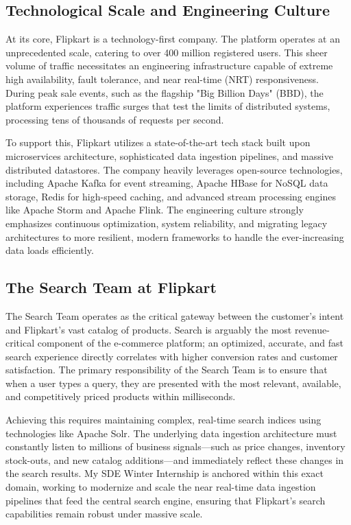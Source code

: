 \subsection{Technological Scale and Engineering Culture}
\begin{justify}
    At its core, Flipkart is a technology-first company. The platform operates at an unprecedented scale, catering to over 400 million registered users. This sheer volume of traffic necessitates an engineering infrastructure capable of extreme high availability, fault tolerance, and near real-time (NRT) responsiveness. During peak sale events, such as the flagship "Big Billion Days" (BBD), the platform experiences traffic surges that test the limits of distributed systems, processing tens of thousands of requests per second.

    To support this, Flipkart utilizes a state-of-the-art tech stack built upon microservices architecture, sophisticated data ingestion pipelines, and massive distributed datastores. The company heavily leverages open-source technologies, including Apache Kafka for event streaming, Apache HBase for NoSQL data storage, Redis for high-speed caching, and advanced stream processing engines like Apache Storm and Apache Flink. The engineering culture strongly emphasizes continuous optimization, system reliability, and migrating legacy architectures to more resilient, modern frameworks to handle the ever-increasing data loads efficiently.
\end{justify}

\subsection{The Search Team at Flipkart}
\begin{justify}
    The Search Team operates as the critical gateway between the customer's intent and Flipkart's vast catalog of products. Search is arguably the most revenue-critical component of the e-commerce platform; an optimized, accurate, and fast search experience directly correlates with higher conversion rates and customer satisfaction. The primary responsibility of the Search Team is to ensure that when a user types a query, they are presented with the most relevant, available, and competitively priced products within milliseconds.

    Achieving this requires maintaining complex, real-time search indices using technologies like Apache Solr. The underlying data ingestion architecture must constantly listen to millions of business signals—such as price changes, inventory stock-outs, and new catalog additions—and immediately reflect these changes in the search results. My SDE Winter Internship is anchored within this exact domain, working to modernize and scale the near real-time data ingestion pipelines that feed the central search engine, ensuring that Flipkart's search capabilities remain robust under massive scale.
\end{justify}

